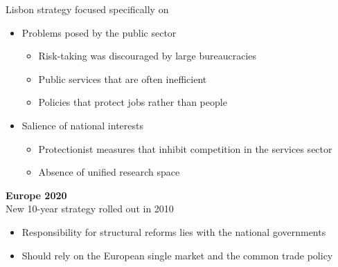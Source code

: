 \documentclass{beamer}
\begin{document}
\begin{frame}
  Lisbon strategy focused specifically on 
  \begin{itemize}
  \item Problems posed by the public sector
  \begin{itemize}
    \item Risk-taking was discouraged by large bureaucracies
    \item Public services that are often inefficient
    \item Policies that protect jobs rather than people
  \end{itemize}
  \item Salience of national interests
  \begin{itemize}
    \item Protectionist measures that inhibit competition in the services sector
    \item Absence of unified research space
  \end{itemize}
\end{itemize}
\end{frame}

\begin{frame}
  \textbf{Europe 2020}\\
  New 10-year strategy rolled out in 2010
  \begin{itemize}
    \item Responsibility for structural reforms lies with the national governments 
    \item Should rely on the European single market and the common trade policy
  \end{itemize}  
\end{frame}
\end{document}
